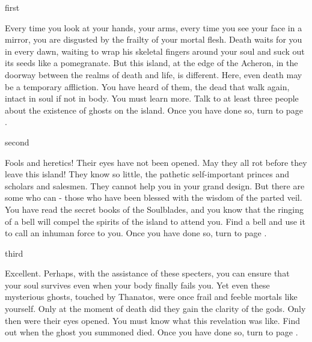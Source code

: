 \documentclass[greennotebook]{Kos}
\begin{document}

\startnotebook{\nStrengthInAnarchy{}}

\begin{page}{first}

Every time you look at your hands, your arms, every time you see your face in a mirror, you are disgusted by the frailty of your mortal flesh. Death waits for you in every dawn, waiting to wrap his skeletal fingers around your soul and suck out its seeds like a pomegranate. But this island, at the edge of the Acheron, in the doorway between the realms of death and life, is different. Here, even death may be a temporary affliction. You have heard of them, the dead that walk again, intact in soul if not in body. You must learn more. Talk to at least three people about the existence of ghosts on the island. Once you have done so, turn to page .

\end{page}

\begin{page}{second}

Fools and heretics! Their eyes have not been opened. May they all rot before they leave this island! They know so little, the pathetic self-important princes and scholars and salesmen. They cannot help you in your grand design. But there are some who can - those who have been blessed with the wisdom of the parted veil. You have read the secret books of the Soulblades, and you know that the ringing of a bell will compel the spirits of the island to attend you. Find a bell and use it to call an inhuman force to you. Once you have done so, turn to page .

\end{page}

\begin{page}{third}

Excellent. Perhaps, with the assistance of these specters, you can ensure that your soul survives even when your body finally fails you. Yet even these mysterious ghosts, touched by Thanatos, were once frail and feeble mortals like yourself. Only at the moment of death did they gain the clarity of the gods. Only then were their eyes opened. You must know what this revelation was like. Find out when the ghost you summoned died. Once you have done so, turn to page .

\end{page}
\end{document}
